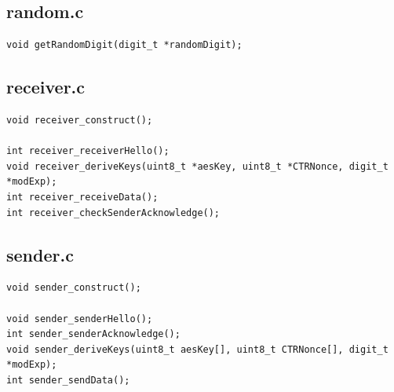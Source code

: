 \documentclass[a4paper]{article}
\begin{document}
\begin{appendices}
\subsection{random.c}

\begin{lstlisting}[numbers=none, xleftmargin=0pt]
void getRandomDigit(digit_t *randomDigit);
\end{lstlisting}

\subsection{receiver.c}

\begin{lstlisting}[numbers=none, xleftmargin=0pt]
void receiver_construct();

int receiver_receiverHello();
void receiver_deriveKeys(uint8_t *aesKey, uint8_t *CTRNonce, digit_t *modExp);
int receiver_receiveData();
int receiver_checkSenderAcknowledge();
\end{lstlisting}

\subsection{sender.c}

\begin{lstlisting}[numbers=none, xleftmargin=0pt]
void sender_construct();

void sender_senderHello();
int sender_senderAcknowledge();
void sender_deriveKeys(uint8_t aesKey[], uint8_t CTRNonce[], digit_t *modExp);
int sender_sendData();
\end{lstlisting}

\end{appendices}
\end{document}
